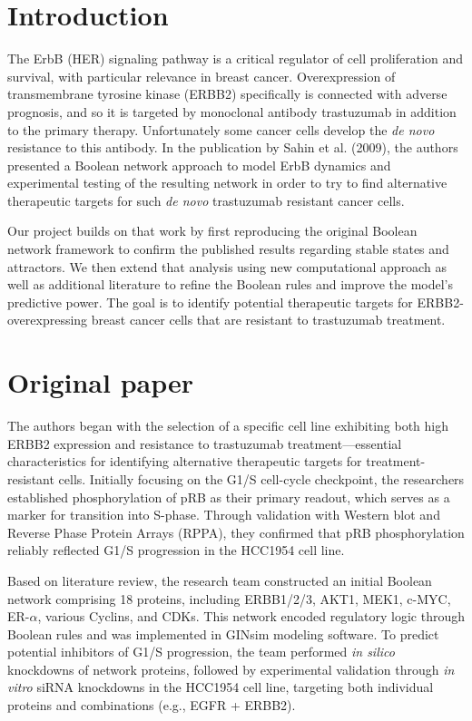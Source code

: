 \documentclass[a4paper,12pt]{article}
\begin{document}
\newpage

\section{Introduction}
The ErbB (HER) signaling pathway is a critical regulator of cell proliferation and survival, with particular relevance in breast cancer. Overexpression of transmembrane tyrosine kinase (ERBB2) specifically is connected with adverse prognosis, and so it is targeted by monoclonal antibody trastuzumab in addition to the primary therapy. Unfortunately some cancer cells develop the \textit{de novo} resistance to this antibody. In the publication by Sahin et al. (2009), the authors presented a Boolean network approach to model ErbB dynamics and experimental testing of the resulting network in order to try to find alternative therapeutic targets for such \textit{de novo} trastuzumab resistant cancer cells.

Our project builds on that work by first reproducing the original Boolean network framework to confirm the published results regarding stable states and attractors. We then extend that analysis using new computational approach as well as additional literature to refine the Boolean rules and improve the model's predictive power. The goal is to identify potential therapeutic targets for ERBB2-overexpressing breast cancer cells that are resistant to trastuzumab treatment.


\section{Original paper}

The authors began with the selection of a specific cell line exhibiting both high ERBB2 expression and resistance to trastuzumab treatment—essential characteristics for identifying alternative therapeutic targets for treatment-resistant cells. Initially focusing on the G1/S cell-cycle checkpoint, the researchers established phosphorylation of pRB as their primary readout, which serves as a marker for transition into S-phase. Through validation with Western blot and Reverse Phase Protein Arrays (RPPA), they confirmed that pRB phosphorylation reliably reflected G1/S progression in the HCC1954 cell line.

Based on literature review, the research team constructed an initial Boolean network comprising 18 proteins, including ERBB1/2/3, AKT1, MEK1, c-MYC, ER-$\alpha$, various Cyclins, and CDKs. This network encoded regulatory logic through Boolean rules and was implemented in GINsim modeling software. To predict potential inhibitors of G1/S progression, the team performed \textit{in silico} knockdowns of network proteins, followed by experimental validation through \textit{in vitro} siRNA knockdowns in the HCC1954 cell line, targeting both individual proteins and combinations (e.g., EGFR + ERBB2).
\end{document}
